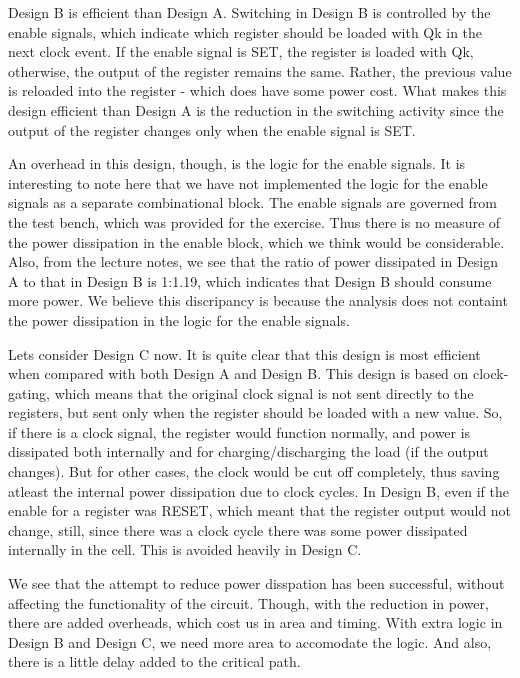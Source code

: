 \documentclass[11pt,a4paper]{article}
\begin{document}
Design B is efficient than Design A. Switching in Design B is controlled by the enable signals, which indicate which register should be loaded with Qk in the next clock event. If the enable signal is SET, the register is loaded with Qk, otherwise, the output of the register remains the same. Rather, the previous value is reloaded into the register - which does have some power cost. What makes this design efficient than Design A is the reduction in the switching activity since the output of the register changes only when the enable signal is SET.

An overhead in this design, though, is the logic for the enable signals. It is interesting to note here that we have not implemented the logic for the enable signals as a separate combinational block. The enable signals are governed from the test bench, which was provided for the exercise. Thus there is no measure of the power dissipation in the enable block, which we think would be considerable. Also, from the lecture notes, we see that the ratio of power dissipated in Design A to that in Design B is 1:1.19, which indicates that Design B should consume more power. We believe this discripancy is because the analysis does not containt the power dissipation in the logic for the enable signals.

Lets consider Design C now. It is quite clear that this design is most efficient when compared with both Design A and Design B. This design is based on clock-gating, which means that the original clock signal is not sent directly to the registers, but sent only when the register should be loaded with a new value. So, if there is a clock signal, the register would function normally, and power is dissipated both internally and for charging/discharging the load (if the output changes). But for other cases, the clock would be cut off completely, thus saving atleast the internal power dissipation due to clock cycles. In Design B, even if the enable for a register was RESET, which meant that the register output would not change, still, since there was a clock cycle there was some power dissipated internally in the cell. This is avoided heavily in Design C.

We see that the attempt to reduce power disspation has been successful, without affecting the functionality of the circuit. Though, with the reduction in power, there are added overheads, which cost us in area and timing. With extra logic in Design B and Design C, we need more area to accomodate the logic. And also, there is a little delay added to the critical path.
\end{document}
